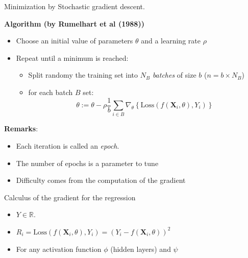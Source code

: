 \documentclass[compress,10pt]{beamer}
\begin{document}
\begin{frame}{Minimization by Stochastic gradient descent.}

\textbf{Algorithm (by Rumelhart et al (1988))}

\begin{itemize}
\item
  Choose an initial value of parameters \(\theta\) and a learning rate
  \(\rho\)
\item
  Repeat until a minimum is reached:

  \begin{itemize}
  
  \item
    Split randomy the training set into \(N_B\) \emph{batches} of size
    \(b\) (\(n = b \times N_B\))
  \item
    for each batch \(B\) set:
    \[ \theta:= \theta - \rho \frac{1}{b}\sum_{i \in B} \nabla_{\theta} \left\{  \text{Loss}(f(\mathbf{X}_i,\theta),Y_i) \right\}\]
  \end{itemize}
\end{itemize}

\textbf{Remarks}:

\begin{itemize}
\item
  Each iteration is called an \emph{epoch}.
\item
  The number of epochs is a parameter to tune
\item
  Difficulty comes from the computation of the gradient
\end{itemize}

\end{frame}
\begin{frame}{Calculus of the gradient for the regression}
\protect\hypertarget{calculus-of-the-gradient-for-the-regression}{}

\begin{itemize}

\item
  \(Y \in \mathbb{R}\).
\item
  \(R_i = \text{Loss}(f(\mathbf{X}_i,\theta),Y_i) = (Y_{i} - f(\mathbf{X}_i,\theta))^2\)
\item
  For any activation function \(\phi\) (hidden layers) and \(\psi\)
\end{itemize}

\end{frame}
\end{document}
